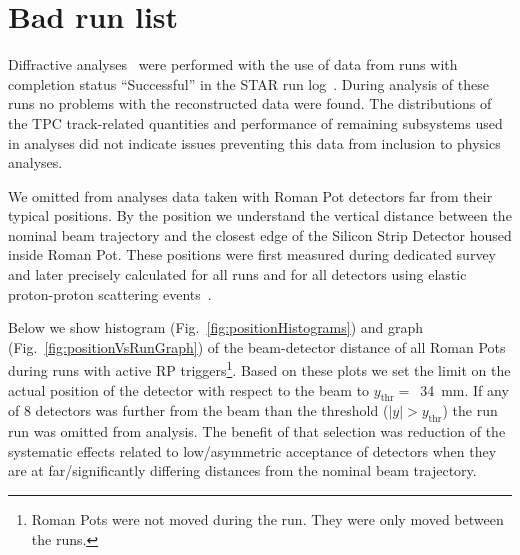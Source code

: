 

\chapter{Bad run list}\label{chap:badRunList}

Diffractive analyses~\cite{AnalysisNoteRafal,AnalysisNoteLukasz} were performed with the use of data from runs with completion status ``Successful'' in the STAR run log~\cite{RunLog}. During analysis of these runs no problems with the reconstructed data were found. The distributions of the TPC track-related quantities and performance of remaining subsystems used in analyses did not indicate issues preventing this data from inclusion to physics analyses.

We omitted from analyses data taken with Roman Pot detectors far from their typical positions. By the position we understand the vertical distance between the nominal beam trajectory and the closest edge of the Silicon Strip Detector housed inside Roman Pot. These positions were first measured during dedicated survey~\cite{surveyNote} and later precisely calculated for all runs and for all detectors using elastic proton-proton scattering events~\cite{alignmentPresentation,alignmentDirectory}.%

Below we show histogram (Fig.~\ref{fig:positionHistograms}) and graph (Fig.~\ref{fig:positionVsRunGraph}) of the beam-detector distance of all Roman Pots during runs with active RP triggers\footnote{Roman Pots were not moved during the run. They were only moved between the runs.}. Based on these plots we set the limit on the actual position of the detector with respect to the beam to $y_{\text{thr}} =$~34~mm. If any of 8 detectors was further from the beam than the threshold ($|y|>y_{\text{thr}}$) the run run was omitted from analysis. The benefit of that selection was reduction of the systematic effects related to low/asymmetric acceptance of detectors when they are at far/significantly differing distances from the nominal beam trajectory.

